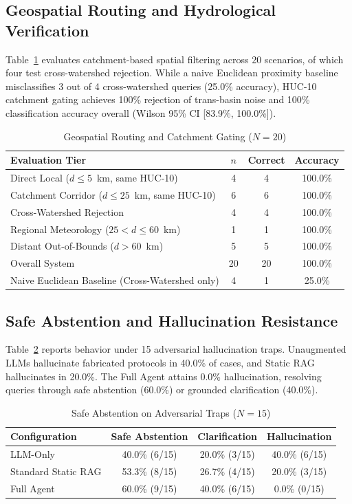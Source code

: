 \documentclass[conference]{IEEEtran}
\begin{document}
\subsection{Geospatial Routing and Hydrological Verification}
Table~\ref{tab:geo} evaluates catchment-based spatial filtering across 20 scenarios, of which four test cross-watershed rejection. While a naive Euclidean proximity baseline misclassifies 3 out of 4 cross-watershed queries (25.0\% accuracy), HUC-10 catchment gating achieves 100\% rejection of trans-basin noise and 100\% classification accuracy overall (Wilson 95\% CI [83.9\%, 100.0\%]).

\begin{table}[ht]
\caption{Geospatial Routing and Catchment Gating ($N=20$)}
\label{tab:geo}
\centering
\scriptsize
\setlength{\tabcolsep}{2.5pt}
\begin{tabular*}{\columnwidth}{@{\extracolsep{\fill}}lccc@{}}
\toprule
Evaluation Tier & $n$ & Correct & Accuracy \\
\midrule
Direct Local ($d \le 5$~km, same HUC-10) & 4 & 4 & 100.0\% \\
Catchment Corridor ($d \le 25$~km, same HUC-10) & 6 & 6 & 100.0\% \\
Cross-Watershed Rejection & 4 & 4 & 100.0\% \\
Regional Meteorology ($25 < d \le 60$~km) & 1 & 1 & 100.0\% \\
Distant Out-of-Bounds ($d > 60$~km) & 5 & 5 & 100.0\% \\
\midrule
Overall System & 20 & 20 & 100.0\% \\
Naive Euclidean Baseline (Cross-Watershed only) & 4 & 1 & 25.0\% \\
\bottomrule
\end{tabular*}
\end{table}

\subsection{Safe Abstention and Hallucination Resistance}
Table~\ref{tab:abstention} reports behavior under 15 adversarial hallucination traps. Unaugmented LLMs hallucinate fabricated protocols in 40.0\% of cases, and Static RAG hallucinates in 20.0\%. The Full Agent attains 0.0\% hallucination, resolving queries through safe abstention (60.0\%) or grounded clarification (40.0\%).

\begin{table}[ht]
\caption{Safe Abstention on Adversarial Traps ($N=15$)}
\label{tab:abstention}
\centering
\footnotesize
\setlength{\tabcolsep}{3pt}
\begin{tabular*}{\columnwidth}{@{\extracolsep{\fill}}lccc@{}}
\toprule
Configuration & Safe Abstention & Clarification & Hallucination \\
\midrule
LLM-Only & 40.0\% (6/15) & 20.0\% (3/15) & 40.0\% (6/15) \\
Standard Static RAG & 53.3\% (8/15) & 26.7\% (4/15) & 20.0\% (3/15) \\
Full Agent & 60.0\% (9/15) & 40.0\% (6/15) & 0.0\% (0/15) \\
\bottomrule
\end{tabular*}
\end{table}
\end{document}
